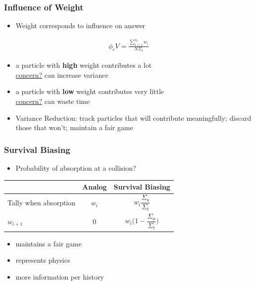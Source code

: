 \documentclass[xcolor=x11names,compress]{beamer}
\renewcommand{\(}{\begin{columns}}
\renewcommand{\)}{\end{columns}}
\newcommand{\<}[1]{\begin{column}{#1}}
\renewcommand{\>}{\end{column}}
\begin{document}
\begin{frame}[fragile]
  \frametitle{Influence of Weight}
  \begin{itemize}
  	\item Weight corresponds to influence on answer
  \end{itemize}
  \begin{align}
  \phi_c V = \frac{\sum_{i=1}^{n_c} w_{i} }{N \Sigma_t} \nonumber 
  \end{align}
  \begin{itemize}
  	\item a particle with \textbf{high} weight contributes a lot
  	\\ \underline{concern?} can increase variance
  	\item a particle with \textbf{low} weight contributes very little
  	\\ \underline{concern?} can waste time  	
  	\item Variance Reduction: track particles that will contribute meaningfully; discard those that won't; maintain a fair game
  \end{itemize}

\end{frame}


\begin{frame}[fragile]
  \frametitle{Survival Biasing}
  \begin{itemize}
  	\item Probability of absorption at a collision?
  \end{itemize}

\begin{tabu}{|X | c |X|}
\hline
 & Analog &  Survival Biasing \\\hline
Tally when absorption & $w_i$ &  \[w_i \frac{\Sigma_a}{\Sigma_t}\]  \\
$w_{i+1}$ & $0$ & \[w_i\bigl(1-\frac{\Sigma_a}{\Sigma_t} \bigr)\] \\\hline
\end{tabu}

  \begin{itemize}
  	\item maintains a fair game
  	\item represents physics
  	\item more information per history
  \end{itemize}

\end{frame}
\end{document}
